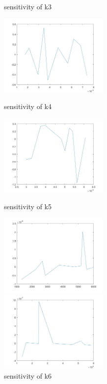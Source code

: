 \begin{figure}
\begin{varwidth}[t]{\textwidth}
	\end{varwidth}
	\caption{sensitivity of k3}
	\begin{varwidth}[t]{\textwidth}
		\vspace{0pt}
		\includegraphics[height=4cm]{s4.jpg}
	\end{varwidth}
	\caption{sensitivity of k4}
	\begin{varwidth}[t]{\textwidth}
		\vspace{0pt}
		\includegraphics[height=4cm]{s5.jpg}
	\end{varwidth}
	\caption{sensitivity of k5}
	\begin{varwidth}[t]{\textwidth}
		\vspace{0pt}
		\includegraphics[height=4cm]{s6.jpg}
	\end{varwidth}
	\caption{sensitivity of k6}
	\begin{varwidth}[t]{\textwidth}
		\vspace{0pt}
		\includegraphics[height=4cm]{s7.jpg}

\end{varwidth}
\end{figure}
